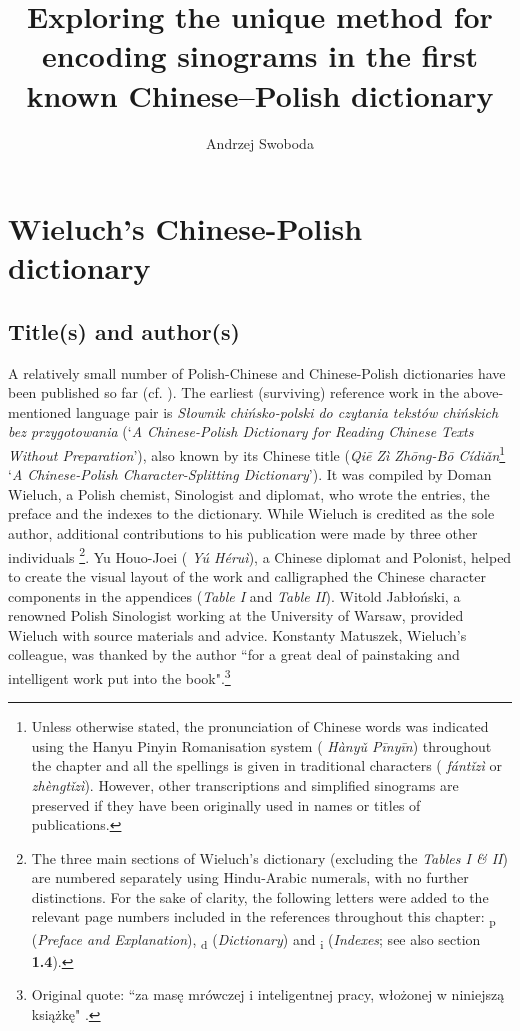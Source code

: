 \documentclass[output=paper,colorlinks,citecolor=brown,arabicfont,chinesefont]{langscibook}
\author{Andrzej Swoboda \affiliation{Jagiellonian University in Krakow}}
\title[Encoding sinograms in the first known Chinese--Polish dictionary]
      {Exploring the unique method for encoding sinograms in the first known Chinese--Polish dictionary}
\begin{document}
\maketitle

\section{Wieluch's Chinese-Polish dictionary}
\subsection{Title(s) and author(s)}

A relatively small number of Polish-Chinese and Chinese-Polish dictionaries have been published so far (cf. \citealt[32]{Sroka-gradziel2018}). The earliest (surviving) reference work in the above-mentioned language pair is \emph{Słownik chińsko-polski do czytania tekstów chińskich bez przygotowania} (‘\emph{A Chinese-Polish Dictionary for Reading Chinese Texts Without Preparation}’), also known by its Chinese title {} (\emph{Qiē Zì Zhōng-Bō Cídiǎn}\footnote{Unless otherwise stated, the pronunciation of Chinese words was indicated using the Hanyu Pinyin Romanisation system ({} \emph{Hànyǔ Pīnyīn}) throughout the chapter and all the spellings is given in traditional characters ({} \emph{fántǐzì} or {} \emph{zhèngtǐzì}). However, other transcriptions and simplified sinograms are preserved if they have been originally used in names or titles of publications.}  ‘\emph{A Chinese-Polish Character-Splitting Dictionary}’). It was compiled by Doman Wieluch, a Polish chemist, Sinologist and diplomat, who wrote the entries, the preface and the indexes to the dictionary. While Wieluch is credited as the sole author, additional contributions to his publication were made by three other individuals \citep[15\textsubscript{p}]{Wieluch1936}\footnote{The three main sections of Wieluch's dictionary (excluding the \emph{Tables I \& II}) are numbered separately using Hindu-Arabic numerals, with no further distinctions. For the sake of clarity, the following letters were added to the relevant page numbers included in the references throughout this chapter:
\textsubscript{p} (\emph{Preface and Explanation}), \textsubscript{d} (\emph{Dictionary}) and \textsubscript{i} (\emph{Indexes}; see also section \textbf{1.4}).}. Yu Houo-Joei ({} \emph{Yú Héruì}), a Chinese diplomat and Polonist, helped to create the visual layout of the work and calligraphed the Chinese character components in the appendices (\emph{Table I} and \emph{Table II}). Witold Jabłoński, a renowned Polish Sinologist working at the University of Warsaw, provided Wieluch with source materials and advice. Konstanty Matuszek, Wieluch's colleague, was thanked by the author “for a great deal of painstaking and intelligent work put into the book".\footnote{Original quote: “za masę mrówczej i inteligentnej pracy, włożonej w niniejszą książkę" \citep[15\textsubscript{p}]{Wieluch1936}.}
\end{document}
